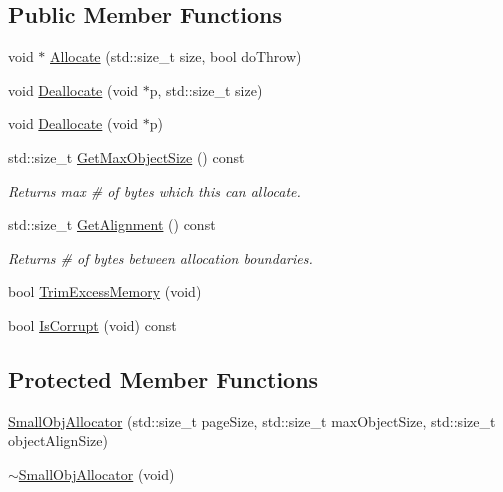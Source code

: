 \subsection*{Public Member Functions}
\begin{DoxyCompactItemize}
\item 
void $\ast$ \hyperlink{classLoki_1_1SmallObjAllocator_aa41bb717d552cd0df57a941def7ec607}{Allocate} (std\+::size\+\_\+t size, bool do\+Throw)
\item 
void \hyperlink{classLoki_1_1SmallObjAllocator_a2b669733cfa9dd157603d13d979f8c1c}{Deallocate} (void $\ast$p, std\+::size\+\_\+t size)
\item 
void \hyperlink{classLoki_1_1SmallObjAllocator_a50406896d75a2591d4bd7dc53325e3d6}{Deallocate} (void $\ast$p)
\item 
\hypertarget{classLoki_1_1SmallObjAllocator_ae49e9de3fd7b2fd93676cc1d63299b0d}{}std\+::size\+\_\+t \hyperlink{classLoki_1_1SmallObjAllocator_ae49e9de3fd7b2fd93676cc1d63299b0d}{Get\+Max\+Object\+Size} () const \label{classLoki_1_1SmallObjAllocator_ae49e9de3fd7b2fd93676cc1d63299b0d}

\begin{DoxyCompactList}\small\item\em Returns max \# of bytes which this can allocate. \end{DoxyCompactList}\item 
\hypertarget{classLoki_1_1SmallObjAllocator_ab1c8a2a3d7e9368ab59422ddd082105c}{}std\+::size\+\_\+t \hyperlink{classLoki_1_1SmallObjAllocator_ab1c8a2a3d7e9368ab59422ddd082105c}{Get\+Alignment} () const \label{classLoki_1_1SmallObjAllocator_ab1c8a2a3d7e9368ab59422ddd082105c}

\begin{DoxyCompactList}\small\item\em Returns \# of bytes between allocation boundaries. \end{DoxyCompactList}\item 
bool \hyperlink{classLoki_1_1SmallObjAllocator_a6b635664b20a6984303dabde86c8ac83}{Trim\+Excess\+Memory} (void)
\item 
bool \hyperlink{classLoki_1_1SmallObjAllocator_a2b7fbd5bf5fc56e45754abd2497ad18f}{Is\+Corrupt} (void) const 
\end{DoxyCompactItemize}
\subsection*{Protected Member Functions}
\begin{DoxyCompactItemize}
\item 
\hyperlink{classLoki_1_1SmallObjAllocator_a3d40b34b1a2d08a6bb9d9fa22ab5ce24}{Small\+Obj\+Allocator} (std\+::size\+\_\+t page\+Size, std\+::size\+\_\+t max\+Object\+Size, std\+::size\+\_\+t object\+Align\+Size)
\item 
\hyperlink{classLoki_1_1SmallObjAllocator_a0c861c4605844ee30dbe2a4f533fe2ae}{$\sim$\+Small\+Obj\+Allocator} (void)
\end{DoxyCompactItemize}


